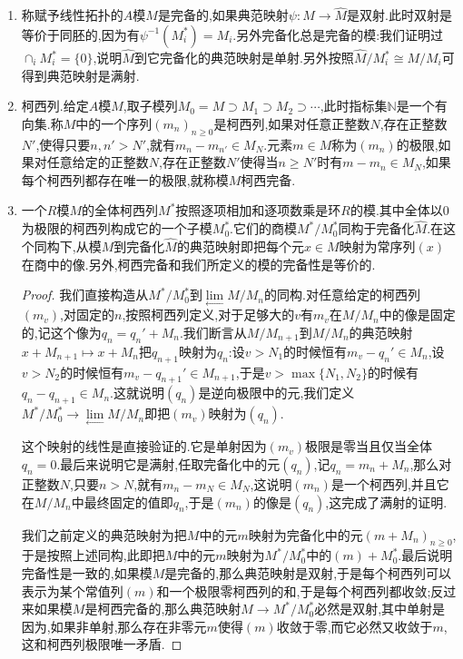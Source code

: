 \begin{enumerate}
\begin{proof}
		假设$\{M_i\}_{i\in I}$和$\{M_j'\}_{j\in J}$是两个子模族,诱导了$M$上相同的拓扑,分别用$\widehat{M}$和$\widehat{M}'$表示对应的完备化.按照拓扑相同,对每个$j\in J$,可取某个$i\in I$使得$M_i\subseteq M_j'$.于是存在典范映射$M/M_i\to M/M_j'$,这得到了复合$\widehat{M}\to M/M_i\to M/M_j'$,这个复合映射不依赖于$i$的选取,按照逆向极限的泛映射性质,得到同态$\widehat{M}\to\widehat{M'}$.对偶的得到$\widehat{M'}\to\widehat{M}$,验证它们互为逆映射,就得到完备化之间的同构.
	\end{proof}
	\item 称赋予线性拓扑的$A$模$M$是完备的,如果典范映射$\psi:M\to\widehat{M}$是双射.此时双射是等价于同胚的,因为有$\psi^{-1}(M^*_i)=M_i$.另外完备化总是完备的模:我们证明过$\cap_iM_i^*=\{0\}$,说明$\widehat{M}$到它完备化的典范映射是单射.另外按照$\widehat{M}/M_i^*\cong M/M_i$可得到典范映射是满射.
	\item 柯西列.给定$A$模$M$,取子模列$M_0=M\supset M_1\supset M_2\supset\cdots$,此时指标集$\mathbb{N}$是一个有向集.称$M$中的一个序列$(m_n)_{n\ge0}$是柯西列,如果对任意正整数$N$,存在正整数$N'$,使得只要$n,n'>N'$,就有$m_n-m_{n'}\in M_{N}$.元素$m\in M$称为$(m_n)$的极限,如果对任意给定的正整数$N$,存在正整数$N'$使得当$n\ge N'$时有$m-m_n\in M_{N}$,如果每个柯西列都存在唯一的极限,就称模$M$柯西完备.
	\item 一个$R$模$M$的全体柯西列$M^*$按照逐项相加和逐项数乘是环$R$的模.其中全体以0为极限的柯西列构成它的一个子模$M^*_0$.它们的商模$M^*/M^*_0$同构于完备化$\widehat{M}$.在这个同构下,从模$M$到完备化$\widehat{M}$的典范映射即把每个元$x\in M$映射为常序列$(x)$在商中的像.另外,柯西完备和我们所定义的模的完备性是等价的.
	\begin{proof}
		
		我们直接构造从$M^*/M^*_0$到$\lim\limits_{\leftarrow}M/M_n$的同构.对任意给定的柯西列$(m_v)$,对固定的$n$,按照柯西列定义,对于足够大的$v$有$m_v$在$M/M_n$中的像是固定的,记这个像为$q_n=q_n'+M_n$.我们断言从$M/M_{n+1}$到$M/M_n$的典范映射$x+M_{n+1}\mapsto x+M_n$把$q_{n+1}$映射为$q_n$:设$v>N_1$的时候恒有$m_v-q_n'\in M_n$,设$v>N_2$的时候恒有$m_v-q_{n+1}'\in M_{n+1}$,于是$v>\max\{N_1,N_2\}$的时候有$q_n-q_{n+1}\in M_{n}$.这就说明$(q_n)$是逆向极限中的元,我们定义$M^*/M^*_0\to\lim\limits_{\leftarrow}M/M_n$即把$(m_v)$映射为$(q_n)$.
		
		这个映射的线性是直接验证的.它是单射因为$(m_v)$极限是零当且仅当全体$q_n=0$.最后来说明它是满射,任取完备化中的元$(q_n)$,记$q_n=m_n+M_n$,那么对正整数$N$,只要$n>N$,就有$m_n-m_N\in M_N$,这说明$(m_n)$是一个柯西列,并且它在$M/M_n$中最终固定的值即$q_n$,于是$(m_n)$的像是$(q_n)$,这完成了满射的证明.
		
		我们之前定义的典范映射为把$M$中的元$m$映射为完备化中的元$(m+M_n)_{n\ge0}$,于是按照上述同构,此即把$M$中的元$m$映射为$M^*/M^*_0$中的$(m)+M^*_0$.最后说明完备性是一致的,如果模$M$是完备的,那么典范映射是双射,于是每个柯西列可以表示为某个常值列$(m)$和一个极限零柯西列的和,于是每个柯西列都收敛;反过来如果模$M$是柯西完备的,那么典范映射$M\to M^*/M^*_0$必然是双射,其中单射是因为,如果非单射,那么存在非零元$m$使得$(m)$收敛于零,而它必然又收敛于$m$,这和柯西列极限唯一矛盾.
	\end{proof}
\end{enumerate}

